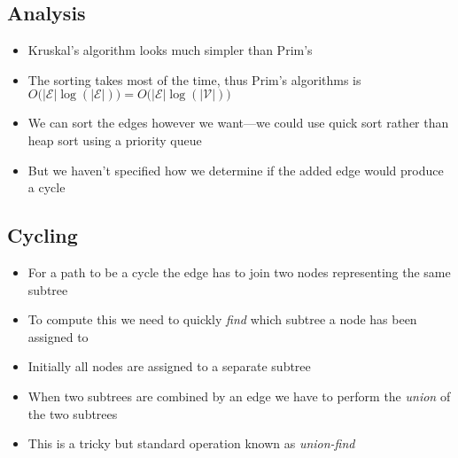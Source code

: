 \begin{slide}
\section{Analysis}

\begin{PauseHighLight}
  \begin{itemize}
  \item Kruskal's algorithm looks much simpler than Prim's\pause
  \item The sorting takes most of the time, thus Prim's algorithms is
    $O\bigl(|\mathcal{E}| \log(|\mathcal{E}|)\bigr) = O\bigl(|\mathcal{E}|
    \log(|\mathcal{V}|)\bigr)$\pause
  \item We can sort the edges however we want---we could use quick sort
    rather than heap sort using a priority queue\pause
  \item But we haven't specified how we determine if the added edge
    would produce a cycle\pause
  \end{itemize}
\end{PauseHighLight}

\end{slide}


\begin{slide}
\section[-1]{Cycling}

\begin{PauseHighLight}
  \begin{itemize}
  \item For a path to be a cycle the edge has to join two nodes
    representing the same subtree\pause
  \item To compute this we need to quickly \emph{find} which subtree a
    node has been assigned to\pause
  \item Initially all nodes are assigned to a separate subtree\pause
  \item When two subtrees are combined by an edge we have to perform the
    \emph{union} of the two subtrees\pause
  \item This is a tricky but standard operation known as
    \emph{union-find}\pause
  \end{itemize}
\end{PauseHighLight}

\end{slide}

